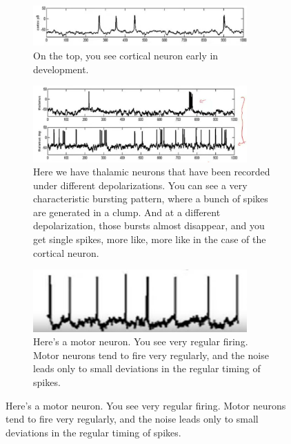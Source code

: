 \documentclass[]{article}
\begin{document}
\begin{figure}[H]
	\caption[The electrical personalities of neurons]{The electrical personalities of neurons.}
	\begin{subfigure}[t]{0.9\textwidth}
		\caption{On the top, you see cortical neuron early in development.}
		\includegraphics[width=0.9\textwidth]{electrical-personalities1}
	\end{subfigure}
	\begin{subfigure}[t]{0.9\textwidth}
		\caption{Here we have thalamic neurons that have been recorded under different depolarizations. You can see a very characteristic bursting pattern, where a bunch of spikes are generated in a clump. And at a different depolarization, those bursts almost disappear, and you get single spikes, more like, more like in	the case of the cortical neuron.}
	\includegraphics[width=0.9\textwidth]{electrical-personalities2}
	\end{subfigure}
	\begin{subfigure}[t]{0.9\textwidth}
		\caption{Here's a motor neuron. You see very regular firing. Motor neurons tend to fire very regularly, and the noise leads only to small deviations in the regular timing of spikes.}
		\includegraphics[width=0.9\textwidth]{electrical-personalities3}
	\end{subfigure}
\end{figure}
\end{document}

